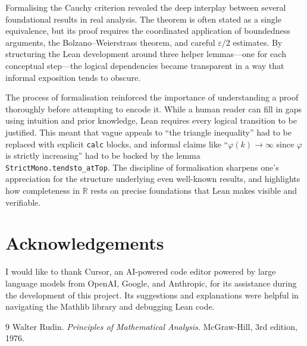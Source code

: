 \documentclass[11pt]{article}
\begin{document}
Formalising the Cauchy criterion revealed the deep interplay between several foundational results in real analysis. The theorem is often stated as a single equivalence, but its proof requires the coordinated application of boundedness arguments, the Bolzano--Weierstrass theorem, and careful \(\varepsilon/2\) estimates. By structuring the Lean development around three helper lemmas---one for each conceptual step---the logical dependencies became transparent in a way that informal exposition tends to obscure.

The process of formalisation reinforced the importance of understanding a proof thoroughly before attempting to encode it. While a human reader can fill in gaps using intuition and prior knowledge, Lean requires every logical transition to be justified. This meant that vague appeals to ``the triangle inequality'' had to be replaced with explicit \texttt{calc} blocks, and informal claims like ``\(\varphi(k)\to\infty\) since \(\varphi\) is strictly increasing'' had to be backed by the lemma \texttt{StrictMono.tendsto_atTop}. The discipline of formalisation sharpens one's appreciation for the structure underlying even well-known results, and highlights how completeness in \(\mathbb{R}\) rests on precise foundations that Lean makes visible and verifiable.

\section*{Acknowledgements}

I would like to thank Cursor, an AI-powered code editor powered by large language models from OpenAI, Google, and Anthropic, for its assistance during the development of this project. Its suggestions and explanations were helpful in navigating the Mathlib library and debugging Lean code.

\begin{thebibliography}{9}
Walter Rudin.
\textit{Principles of Mathematical Analysis}.
McGraw-Hill, 3rd edition, 1976.
\end{thebibliography}
\end{document}
